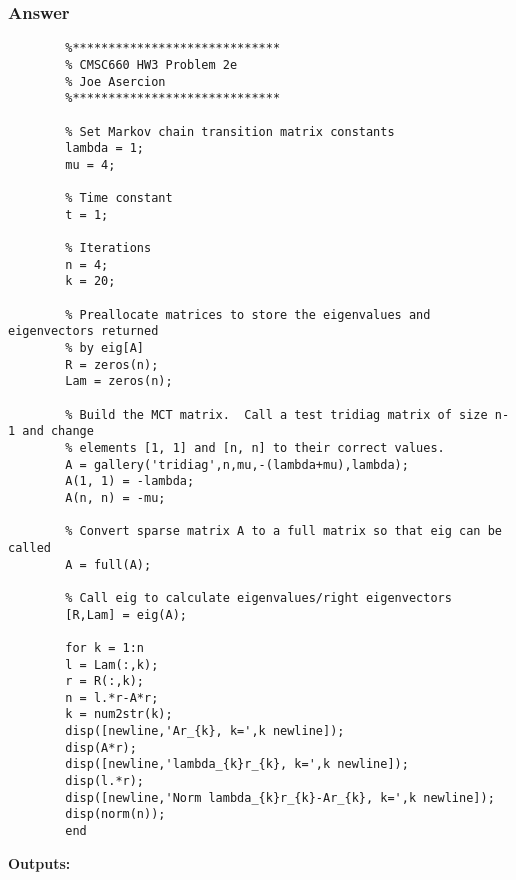 \documentclass{article}
\newcommand{\n}{\newline}
\begin{document}
		\subsubsection{Answer}
		\begin{lstlisting}
		%*****************************
		% CMSC660 HW3 Problem 2e
		% Joe Asercion
		%***************************** 
		
		% Set Markov chain transition matrix constants
		lambda = 1;
		mu = 4;
		
		% Time constant
		t = 1;
		
		% Iterations
		n = 4;
		k = 20;
		
		% Preallocate matrices to store the eigenvalues and eigenvectors returned 
		% by eig[A]
		R = zeros(n);
		Lam = zeros(n);
		
		% Build the MCT matrix.  Call a test tridiag matrix of size n-1 and change
		% elements [1, 1] and [n, n] to their correct values.
		A = gallery('tridiag',n,mu,-(lambda+mu),lambda);
		A(1, 1) = -lambda;
		A(n, n) = -mu;
		
		% Convert sparse matrix A to a full matrix so that eig can be called
		A = full(A);
		
		% Call eig to calculate eigenvalues/right eigenvectors
		[R,Lam] = eig(A);
		
		for k = 1:n
		l = Lam(:,k);
		r = R(:,k);
		n = l.*r-A*r;
		k = num2str(k);
		disp([newline,'Ar_{k}, k=',k newline]);
		disp(A*r);
		disp([newline,'lambda_{k}r_{k}, k=',k newline]);
		disp(l.*r);
		disp([newline,'Norm lambda_{k}r_{k}-Ar_{k}, k=',k newline]);
		disp(norm(n));
		end
		\end{lstlisting}
		\textbf{Outputs:\n}
\end{document}
